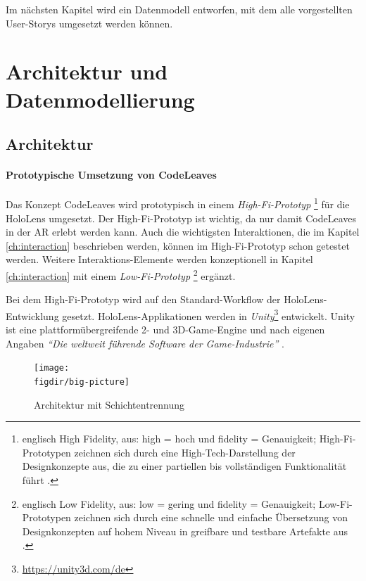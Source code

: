 Im nächsten Kapitel wird ein Datenmodell entworfen, mit dem alle vorgestellten User-Storys umgesetzt werden können.

\chapter{Architektur und Datenmodellierung}
\label{ch:data-model}
\section{Architektur}
\label{ch:data-layers}

\subsubsection*{Prototypische Umsetzung von CodeLeaves}

Das Konzept CodeLeaves wird prototypisch in einem \textit{High-Fi-Prototyp}
\footnote{englisch High Fidelity, aus: high = hoch und fidelity = Genauigkeit; High-Fi-Prototypen zeichnen sich durch eine High-Tech-Darstellung der Designkonzepte aus, die zu einer partiellen bis vollständigen Funktionalität führt \cite{egger2000fi}.}
für die HoloLens umgesetzt. Der High-Fi-Prototyp ist wichtig, da nur damit CodeLeaves in der AR erlebt werden kann. Auch die wichtigsten Interaktionen, die im Kapitel \ref{ch:interaction} beschrieben werden, können im High-Fi-Prototyp schon getestet werden. Weitere Interaktions-Elemente werden konzeptionell in Kapitel \ref{ch:interaction} mit einem \textit{Low-Fi-Prototyp}
\footnote{englisch Low Fidelity, aus: low = gering und fidelity = Genauigkeit; Low-Fi-Prototypen zeichnen sich durch eine schnelle und einfache Übersetzung von Designkonzepten auf hohem Niveau in greifbare und testbare Artefakte aus \cite{egger2000fi}.}
ergänzt.

Bei dem High-Fi-Prototyp wird auf den Standard-Workflow der HoloLens-Entwicklung gesetzt. HoloLens-Applikationen werden in \textit{Unity}\footnote{\url{https://unity3d.com/de}} entwickelt. Unity ist eine platt\-form\-über\-grei\-fen\-de 2- und 3D-Game-Engine und nach eigenen Angaben \textit{"`Die weltweit führende Software der Game-Industrie"'} \cite{unity2017public}.

\begin{figure}[htb]
  \texttt{[image: \\figdir/big-picture]}
  \caption{Architektur mit Schichtentrennung}
  \label{fig:architecture}
\end{figure}

